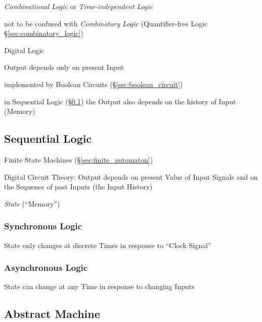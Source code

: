 \emph{Combinational Logic} or \emph{Time-independent Logic}

\fist not to be confused with \emph{Combinatory Logic} (Quantifier-free Logic
\S\ref{sec:combinatory_logic})

Digital Logic

Output depends only on present Input

implemented by Boolean Circuits (\S\ref{sec:boolean_circuit})

in Sequential Logic (\S\ref{sec:sequential_logic}) the Output also
depends on the history of Input (Memory)




\subsection{Sequential Logic}\label{sec:sequential_logic}


Finite State Machines (\S\ref{sec:finite_automaton})

Digital Circuit Theory: Output depends on present Value of Input
Signals and on the Sequence of past Inputs (the Input History)

\emph{State} (``Memory'')



\subsubsection{Synchronous Logic}\label{sec:synchronous_logic}

State only changes at discrete Times in response to ``Clock Signal''



\subsubsection{Asynchronous Logic}\label{sec:asynchronous_logic}

State can change at any Time in response to changing Inputs



\subsection{Abstract Machine} \label{sec:abstract_machine}

